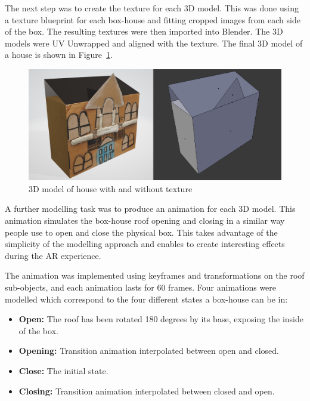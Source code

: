 \documentclass[acmlarge,screen,dvipsnames]{acmart}
\begin{document}
The next step was to create the
texture for each 3D model. This was done using a texture blueprint for each box-house and fitting cropped images from each side of the box. The resulting
textures were then imported into Blender. The 3D models were UV Unwrapped and
aligned with the texture. The final 3D model of a house is shown in
Figure~\ref{fig:3Dhouse}. 

\begin{figure}[h] \centering
\includegraphics[width=\linewidth]{images/models.PNG} \caption{3D model
of house with and without texture} \label{fig:3Dhouse} 
\end{figure}

A further modelling task was to produce an animation for each 3D model. This
animation simulates the box-house roof opening and closing in a similar way people use to open and close the physical box. This takes advantage of the simplicity of the modelling approach and enables to create interesting effects during the AR experience.

The animation was implemented using
keyframes and transformations on the roof sub-objects, and each animation
lasts for 60 frames. Four animations were modelled which correspond to the
four different states a box-house can be in: 

\begin{itemize} 
  \item \textbf{Open:}
The roof has been rotated 180 degrees by its base, exposing the inside of the
box. 
\item \textbf{Opening:} Transition animation interpolated between open
and closed. 
\item \textbf{Close:} The initial state.  
\item \textbf{Closing:} Transition animation interpolated between closed and open. 

\end{itemize}


\end{document}
